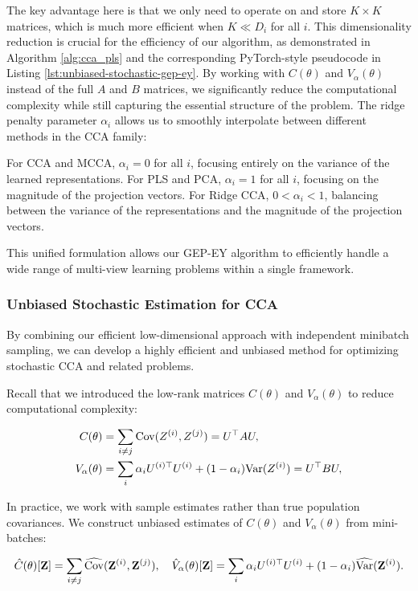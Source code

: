 The key advantage here is that we only need to operate on and store $K \times K$ matrices, which is much more efficient when $K \ll D_i$ for all $i$. This dimensionality reduction is crucial for the efficiency of our algorithm, as demonstrated in Algorithm \ref{alg:cca_pls} and the corresponding PyTorch-style pseudocode in Listing \ref{lst:unbiased-stochastic-gep-ey}.
By working with $C(\theta)$ and $V_\alpha(\theta)$ instead of the full $A$ and $B$ matrices, we significantly reduce the computational complexity while still capturing the essential structure of the problem. The ridge penalty parameter $\alpha_i$ allows us to smoothly interpolate between different methods in the CCA family:

For CCA and MCCA, $\alpha_i = 0$ for all $i$, focusing entirely on the variance of the learned representations.
For PLS and PCA, $\alpha_i = 1$ for all $i$, focusing on the magnitude of the projection vectors.
For Ridge CCA, $0 < \alpha_i < 1$, balancing between the variance of the representations and the magnitude of the projection vectors.

This unified formulation allows our GEP-EY algorithm to efficiently handle a wide range of multi-view learning problems within a single framework.
\subsubsection{Unbiased Stochastic Estimation for CCA}

By combining our efficient low-dimensional approach with independent minibatch sampling, we can develop a highly efficient and unbiased method for optimizing stochastic CCA and related problems.

Recall that we introduced the low-rank matrices $C(\theta)$ and $V_\alpha(\theta)$ to reduce computational complexity:

\begin{align}\label{eq:def-C-V-matrices}
C(\theta) &= \sum_{i \neq j} \mathrm{Cov}(Z^{(i)}, Z^{(j)}) = U^\top A U, \\
V_\alpha(\theta) &= \sum_i \alpha_i U^{(i)\top} U^{(i)} + (1 - \alpha_i) \mathrm{Var}(Z^{(i)}) = U^\top B U,
\end{align}

In practice, we work with sample estimates rather than true population covariances. We construct unbiased estimates of $C(\theta)$ and $V_\alpha(\theta)$ from mini-batches:

\begin{align}\label{eq:def-C-V-matrices-empirical}
\hat{C}(\theta)[\mathbf{Z}] = \sum_{i \neq j} \widehat{\mathrm{Cov}}(\mathbf{Z}^{(i)}, \mathbf{Z}^{(j)}), \quad
\hat{V}_\alpha(\theta)[\mathbf{Z}] = \sum_{i} \alpha_i U^{(i)\top} U^{(i)} + (1 - \alpha_i) \widehat{\mathrm{Var}}(\mathbf{Z}^{(i)}).
\end{align}


